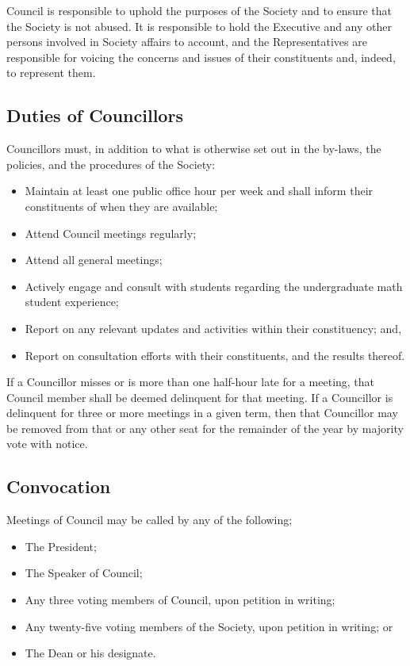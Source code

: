 Council is responsible to uphold the purposes of the Society and to ensure that
the Society is not abused. It is responsible to hold the Executive and any other
persons involved in Society affairs to account, and the Representatives are
responsible for voicing the concerns and issues of their constituents and,
indeed, to represent them. 

\subsection{Duties of Councillors}

Councillors must, in addition to what is otherwise set out in the by-laws,
the policies, and the procedures of the Society:
\begin{itemize}
\item Maintain at least one public office hour per week and shall 
inform their constituents of when they are available; 
\item Attend Council meetings regularly; 
\item Attend all general meetings;
\item Actively engage and consult with students regarding the undergraduate math student
    experience;
\item Report on any relevant updates and activities within their constituency; and,
\item Report on consultation efforts with their constituents, and the results thereof.
\end{itemize}

If a Councillor misses or is more than one half-hour late for a meeting, that Council
member shall be deemed delinquent for that meeting. If a Councillor is
delinquent for three or more meetings in a given term, then that Councillor may
be removed from that or any other seat for the remainder of the year by majority
vote with notice.

\subsection{Convocation}
Meetings of Council may be called by any of the following;
\begin{itemize}
  \item The President;
  \item The Speaker of Council;
  \item Any three voting members of Council, upon petition in writing;
  \item Any twenty-five voting members of the Society, upon petition in writing;
    or
  \item The Dean or his designate.
\end{itemize}

